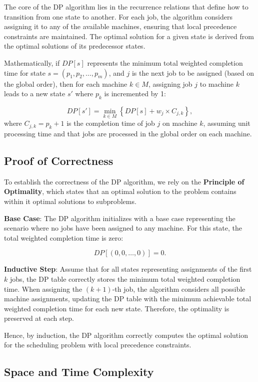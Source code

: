 The core of the DP algorithm lies in the recurrence relations that define how to transition from one state to another. For each job, the algorithm considers assigning it to any of the available machines, ensuring that local precedence constraints are maintained. The optimal solution for a given state is derived from the optimal solutions of its predecessor states.

Mathematically, if $DP[s]$ represents the minimum total weighted completion time for state $s = (p_1, p_2, \dots, p_m)$, and $j$ is the next job to be assigned (based on the global order), then for each machine $k \in M$, assigning job $j$ to machine $k$ leads to a new state $s'$ where $p_k$ is incremented by 1:

\[
    DP[s'] = \min_{k \in M} \left\{ DP[s] + w_j \times C_{j,k} \right\},
\]
where $C_{j,k} = p_k + 1$ is the completion time of job $j$ on machine $k$, assuming unit processing time and that jobs are processed in the global order on each machine.

\subsection{Proof of Correctness}

To establish the correctness of the DP algorithm, we rely on the \textbf{Principle of Optimality}, which states that an optimal solution to the problem contains within it optimal solutions to subproblems.

\textbf{Base Case}: The DP algorithm initializes with a base case representing the scenario where no jobs have been assigned to any machine. For this state, the total weighted completion time is zero:

\[
    DP[(0, 0, \dots, 0)] = 0.
\]

\textbf{Inductive Step}: Assume that for all states representing assignments of the first $k$ jobs, the DP table correctly stores the minimum total weighted completion time. When assigning the $(k+1)$-th job, the algorithm considers all possible machine assignments, updating the DP table with the minimum achievable total weighted completion time for each new state. Therefore, the optimality is preserved at each step.

Hence, by induction, the DP algorithm correctly computes the optimal solution for the scheduling problem with local precedence constraints.

\subsection{Space and Time Complexity}

